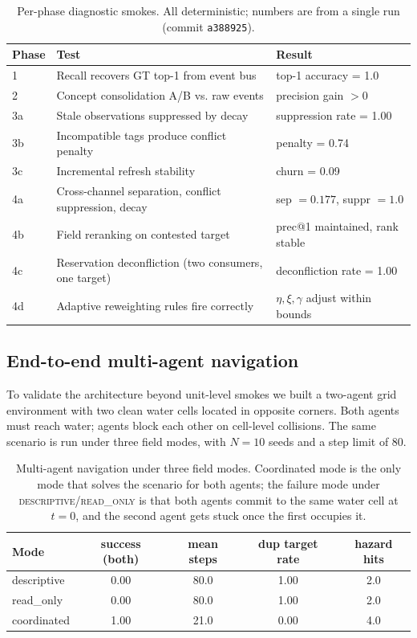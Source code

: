 \begin{table}[h]
\centering
\small
\caption{Per-phase diagnostic smokes.  All deterministic; numbers are
from a single run (commit \texttt{a388925}).}
\label{tab:collective-smoke}
\begin{tabular}{lll}
\toprule
Phase & Test & Result \\
\midrule
1     & Recall recovers GT top-1 from event bus & top-1 accuracy = 1.0 \\
2     & Concept consolidation A/B vs. raw events & precision gain $>0$ \\
3a    & Stale observations suppressed by decay & suppression rate = 1.00 \\
3b    & Incompatible tags produce conflict penalty & penalty = 0.74 \\
3c    & Incremental refresh stability & churn = 0.09 \\
4a    & Cross-channel separation, conflict suppression, decay & sep $=0.177$, suppr $=1.0$ \\
4b    & Field reranking on contested target & prec@1 maintained, rank stable \\
4c    & Reservation deconfliction (two consumers, one target) & deconfliction rate = 1.00 \\
4d    & Adaptive reweighting rules fire correctly & $\eta,\xi,\gamma$ adjust within bounds \\
\bottomrule
\end{tabular}
\end{table}

\subsection{End-to-end multi-agent navigation}
\label{sec:collective-multiagent}

To validate the architecture beyond unit-level smokes we built a
two-agent grid environment with two clean water cells located in
opposite corners.  Both agents must reach water; agents block each
other on cell-level collisions.  The same scenario is run under three
field modes, with $N=10$ seeds and a step limit of 80.

\begin{table}[h]
\centering
\small
\caption{Multi-agent navigation under three field modes.
Coordinated mode is the only mode that solves the scenario for both
agents; the failure mode under \textsc{descriptive}/\textsc{read\_only}
is that both agents commit to the same water cell at $t=0$, and the
second agent gets stuck once the first occupies it.}
\label{tab:multiagent-end-to-end}
\begin{tabular}{lcccc}
\toprule
Mode & success (both) & mean steps & dup target rate & hazard hits \\
\midrule
descriptive  & 0.00 & 80.0 & 1.00 & 2.0 \\
read\_only   & 0.00 & 80.0 & 1.00 & 2.0 \\
coordinated  & 1.00 & 21.0 & 0.00 & 4.0 \\
\bottomrule
\end{tabular}
\end{table}


